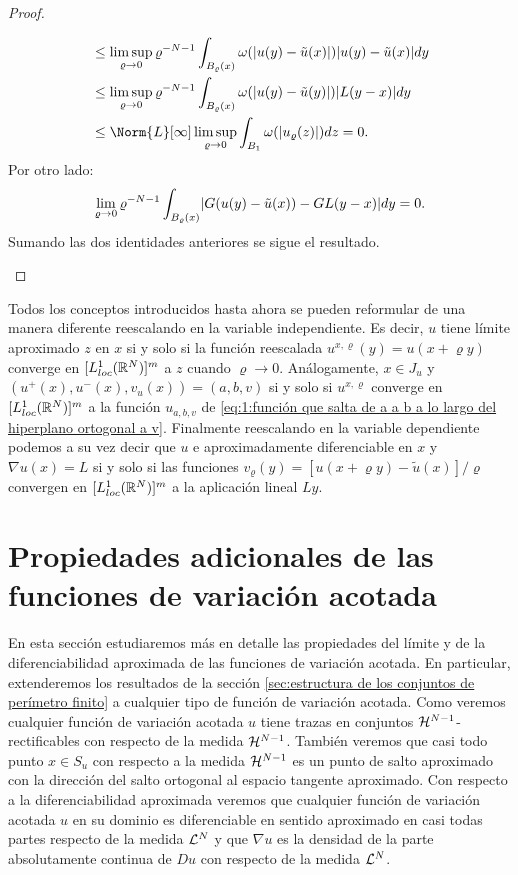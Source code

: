 \documentclass[a4paper,11pt,spanish, twoside, leqno]{tfm-uam}
\begin{document}
\begin{proof}
\begin{enumerate}[(a)]
\begin{align*}
&\leq \limsup_{\varrho \to 0}\varrho^{-N-1} \int_{B_{\varrho}(x)}\omega(\abs{u(y)-\tilde{u}(x)})\abs{u(y)-\tilde{u}(x)}dy\\
&\leq \limsup_{\varrho \to 0}\varrho^{-N-1} \int_{B_{\varrho}(x)}\omega(\abs{u(y)-\tilde{u}(y)})\abs{L(y-x)}dy\\
&\leq \Norm{L}[\infty]\limsup_{\varrho \to 0}\int_{B_{1}}\omega(\abs{u_{\varrho}(z)})dz=0.
\end{align*}
Por otro lado:
\begin{align*}
\lim_{\varrho\to 0}\varrho^{-N-1}\int_{B_{\varrho}(x)}\lvert G(u(y)-\tilde{u}(x))-GL(y-x)\rvert dy=0.
\end{align*}
Sumando las dos identidades anteriores se sigue el resultado.
\end{enumerate}
\end{proof}

Todos los conceptos introducidos hasta ahora se pueden reformular de una manera diferente reescalando en la variable independiente. 
Es decir, $u$ tiene límite aproximado $z$ en $x$ si y solo si la función reescalada $u^{x,\varrho}(y)=u(x+\varrho y)$ converge en $[L_{loc}^{1}(\mathbb{R}^{N})]^{m}$ a $z$ cuando $\varrho\to 0$. Análogamente, $x\in J_{u}$ y $(u^{+}(x), u^{-}(x), v_{u}(x))=(a,b,v)$ si y solo si $u^{x,\varrho}$ converge en $[L_{loc}^{1}(\mathbb{R}^{N})]^{m}$ a la función $u_{a,b,v}$ de \ref{eq:1:función que salta de a a b a lo largo del hiperplano ortogonal a v}. Finalmente reescalando en la variable dependiente podemos a su vez decir que $u$ e aproximadamente diferenciable en $x$ y $\nabla u(x)=L$ si y solo si las funciones $v_{\varrho}(y)=[u(x+\varrho y)-\tilde{u}(x)]/\varrho$ convergen en $[L_{loc}^{1}(\mathbb{R}^{N})]^{m}$ a la aplicación lineal $Ly$.

\section{Propiedades adicionales de las funciones de variación acotada}\label{sec:propiedades ajustadas de las funciones de variación acotada}

En esta sección estudiaremos más en detalle las propiedades del límite y de la diferenciabilidad aproximada de las funciones de variación acotada. En particular, extenderemos los resultados de la sección \ref{sec:estructura de los conjuntos de perímetro finito} a cualquier tipo de función de variación acotada. Como veremos cualquier función de variación acotada $u$ tiene trazas en conjuntos $\mathcal{H}^{N-1}$-rectificables con respecto de la medida $\mathcal{H}^{N-1}$. También veremos que casi todo punto $x\in S_{u}$ con respecto a la medida $\mathcal{H}^{N-1}$ es un punto de salto aproximado con la dirección del salto ortogonal al espacio tangente aproximado. Con respecto a la diferenciabilidad aproximada veremos que cualquier función de variación acotada $u$ en su dominio es diferenciable en sentido aproximado en casi todas partes respecto de la medida $\mathcal{L}^{N}$ y que $\nabla u$ es la densidad de la parte absolutamente continua de $Du$ con respecto de la medida $\mathcal{L}^{N}$.
\end{document}
